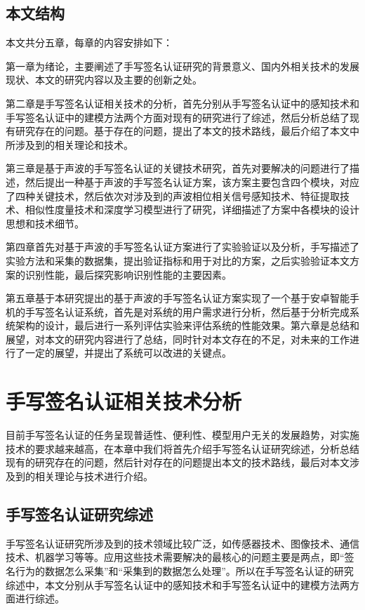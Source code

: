 \section{本文结构}

本文共分五章，每章的内容安排如下：

第一章为绪论，主要阐述了手写签名认证研究的背景意义、国内外相关技术的发展现状、本文的研究内容以及主要的创新之处。

第二章是手写签名认证相关技术的分析，首先分别从手写签名认证中的感知技术和手写签名认证中的建模方法两个方面对现有的研究进行了综述，然后分析总结了现有研究存在的问题。基于存在的问题，提出了本文的技术路线，最后介绍了本文中所涉及到的相关理论和技术。

第三章是基于声波的手写签名认证的关键技术研究，首先对要解决的问题进行了描述，然后提出一种基于声波的手写签名认证方案，该方案主要包含四个模块，对应了四种关键技术，然后依次对涉及到的声波相位相关信号感知技术、特征提取技术、相似性度量技术和深度学习模型进行了研究，详细描述了方案中各模块的设计思想和技术细节。

第四章首先对基于声波的手写签名认证方案进行了实验验证以及分析，手写描述了实验方法和采集的数据集，提出验证指标和用于对比的方案，之后实验验证本文方案的识别性能，最后探究影响识别性能的主要因素。

第五章基于本研究提出的基于声波的手写签名认证方案实现了一个基于安卓智能手机的手写签名认证系统，首先是对系统的用户需求进行分析，然后基于分析完成系统架构的设计，最后进行一系列评估实验来评估系统的性能效果。第六章是总结和展望，对本文的研究内容进行了总结，同时针对本文存在的不足，对未来的工作进行了一定的展望，并提出了系统可以改进的关键点。

\chapter{手写签名认证相关技术分析}
\label{chap:related-work}
目前手写签名认证的任务呈现普适性、便利性、模型用户无关的发展趋势，对实施技术的要求越来越高，在本章中我们将首先介绍手写签名认证研究综述，分析总结现有的研究存在的问题，然后针对存在的问题提出本文的技术路线，最后对本文涉及到的相关理论与技术进行介绍。
\section{手写签名认证研究综述}
手写签名认证研究所涉及到的技术领域比较广泛，如传感器技术、图像技术、通信技术、机器学习等等。应用这些技术需要解决的最核心的问题主要是两点，即“签名行为的数据怎么采集”和“采集到的数据怎么处理”。所以在手写签名认证的研究综述中，本文分别从手写签名认证中的感知技术和手写签名认证中的建模方法两方面进行综述。
